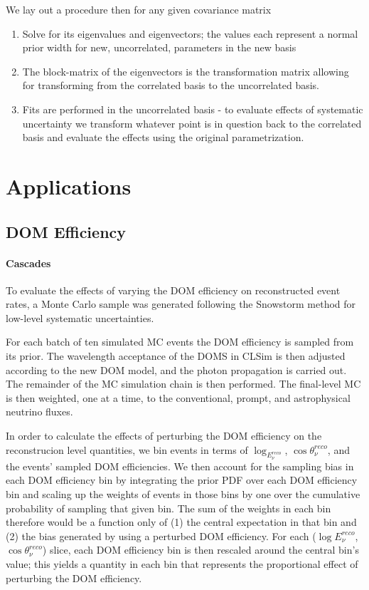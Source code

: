 \documentclass[main.tex]{subfiles}
\begin{document}
We lay out a procedure then for any given covariance matrix
\begin{enumerate}
    \item Solve for its eigenvalues and eigenvectors; the values each represent a normal prior width for new, uncorrelated, parameters in the new basis
    \item The block-matrix of the eigenvectors is the transformation matrix allowing for transforming from the correlated basis to the uncorrelated basis. 
    \item Fits are performed in the uncorrelated basis - to evaluate effects of systematic uncertainty we transform whatever point is in question back to the correlated basis and evaluate the effects using the original parametrization. 
\end{enumerate}

\section{Applications}
\subsection{DOM Efficiency}\label{subsect:domeff}

\paragraph{Cascades}

To evaluate the effects of varying the DOM efficiency on reconstructed event rates, a Monte Carlo sample was generated following the Snowstorm method for low-level systematic uncertainties.

For each batch of ten simulated MC events the DOM efficiency is sampled from its prior. 
The wavelength acceptance of the DOMS in CLSim is then adjusted according to the new DOM model, and the photon propagation is carried out. 
The remainder of the MC simulation chain is then performed.
The final-level MC is then weighted, one at a time, to the conventional, prompt, and astrophysical neutrino fluxes. 

In order to calculate the effects of perturbing the DOM efficiency on the reconstrucion level quantities, we bin events in terms of $\log_{E_{\nu}^{reco}}$, $\cos\theta_{\nu}^{reco}$, and the events' sampled DOM efficiencies. 
We then account for the sampling bias in each DOM efficiency bin by integrating the prior PDF over each DOM efficiency bin and scaling up the weights of events in those bins by one over the cumulative probability of sampling that given bin. 
The sum of the weights in each bin therefore would be a function only of (1) the central expectation in that bin and (2) the bias generated by using a perturbed DOM efficiency. 
For each ($\log E_{\nu}^{reco}$, $\cos\theta_{\nu}^{reco}$) slice, each DOM efficiency bin is then rescaled around the central bin's value; this yields a quantity in each bin that represents the proportional effect of perturbing the DOM efficiency. 
\end{document}
